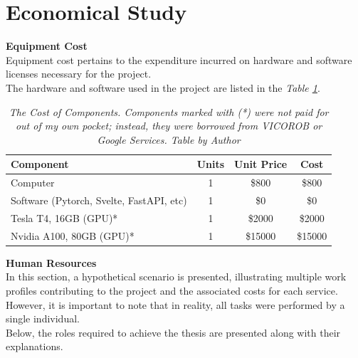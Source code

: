 \section{Economical Study}

\vspace{0.5cm}
\textbf{Equipment Cost} \\

Equipment cost pertains to the expenditure incurred on hardware and software licenses necessary for the project. \\

The hardware and software used in the project are listed in the \textit{Table \ref{table:equipment_cost}}.

\begin{table}[H]
\centering
\begin{tabular}{lccc}
	 \toprule
    \textbf{Component} & \textbf{Units} & \textbf{Unit Price} & \textbf{Cost} \\
		\midrule
    Computer & 1 & \$800 & \$800 \\
    Software (Pytorch, Svelte, FastAPI, etc) & 1 & \$0 & \$0 \\
    Tesla T4, 16GB (GPU)* & 1 & \$2000 & \$2000 \\
    Nvidia A100, 80GB (GPU)* & 1 & \$15000 & \$15000 \\
		\bottomrule
\end{tabular}
\caption[The Cost of Components.]
  {\textit{The Cost of Components.
  Components marked with (*) were not paid for out of my own pocket; instead, they were borrowed from VICOROB or
  Google Services. Table by Author}}
{\label{table:equipment_cost}}
\end{table}

\vspace{0.5cm}
\textbf{Human Resources} \\

In this section, a hypothetical scenario is presented, illustrating multiple work profiles contributing to the project and the associated costs for each service. However, it is important to note that in reality, all tasks were performed by a single individual. \\

Below, the roles required to achieve the thesis are presented along with their explanations. \\


